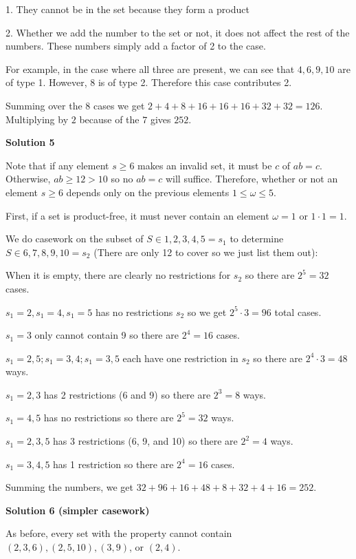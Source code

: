 \begin{enumerate}
 1. They cannot be in the set because they form a product

 2. Whether we add the number to the set or not, it does not affect the rest of the numbers. These numbers simply add a factor of 2 to the case.

 For example, in the case where all three are present, we can see that $4, 6, 9, 10$ are of type 1. However, $8$ is of type 2. Therefore this case contributes 2. 

 Summing over the 8 cases we get $2 + 4 + 8 + 16 + 16 + 16 + 32 + 32 = 126.$ Multiplying by $2$ because of the $7$ gives $252.$




\textbf{Solution 5}

Note that if any element $s\geq6$ makes an invalid set, it must be $c$ of $ab=c$. Otherwise, $ab\geq12>10$ so no $ab=c$ will suffice. Therefore, whether or not an element $s\geq6$ depends only on the previous elements $1\leq\omega\leq5$.

 First, if a set is product-free, it must never contain an element $\omega=1$ or $1\cdot1=1$.

 We do casework on the subset of $S\in{1,2,3,4,5}=s_1$ to determine $S\in{6,7,8,9,10}=s_2$ (There are only 12 to cover so we just list them out):

 When it is empty, there are clearly no restrictions for $s_2$ so there are $2^5=32$ cases.

 $s_1={2}, s_1={4}, s_1={5}$ has no restrictions $s_2$ so we get $2^5\cdot3=96$ total cases.

 $s_1=3$ only cannot contain 9 so there are $2^4=16$ cases.

 $s_1={2, 5}; s_1={3, 4}; s_1={3, 5}$ each have one restriction in $s_2$ so there are $2^4\cdot3=48$ ways.

 $s_1={2, 3}$ has 2 restrictions (6 and 9) so there are $2^3=8$ ways.

 $s_1={4, 5}$ has no restrictions so there are $2^5=32$ ways.

 $s_1={2, 3, 5}$ has 3 restrictions (6, 9, and 10) so there are $2^2=4$ ways.

 $s_1={3, 4, 5}$ has 1 restriction so there are $2^4=16$ cases.

 Summing the numbers, we get $32+96+16+48+8+32+4+16=\boxed{252}$.

 



\textbf{Solution 6 (simpler casework)}

As before, every set with the property cannot contain $(2, 3, 6), (2, 5, 10), (3, 9)$, or $(2, 4)$.


\end{enumerate}

